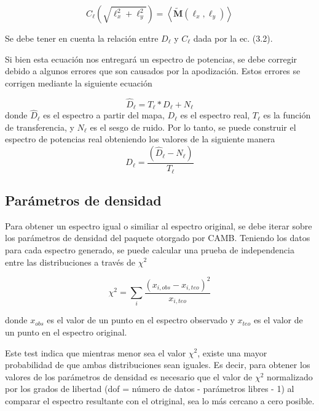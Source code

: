 \documentclass[twocolumn,letterpaper,spanish]{revtex4}
\numberwithin{equation}{section}
\begin{document}
\begin{equation}
C_{\ell}\left(\sqrt{\ell_{x}^{2}+\ell_{y}^{2}}\right)=\left\langle\tilde{\mathbf{M}}\left(\ell_{x}, \ell_{y}\right)\right\rangle
\end{equation}

Se debe tener en cuenta la relaci\'on entre $D_{\ell}$ y $C_{\ell}$ dada por la ec. (3.2).

Si bien esta ecuaci\'on nos entregar\'a un espectro de potencias, se debe corregir debido a algunos errores que son causados por la apodizaci\'on. Estos errores se corrigen mediante la siguiente ecuaci\'on

\begin{equation}
\hat{D}_{\ell}=T_{\ell} * D_{\ell}+N_{\ell}
\end{equation}
donde $\hat{D}_{\ell}$ es el espectro a partir del mapa, $D_{\ell}$ es el espectro real, $T_{\ell}$ es la funci\'on de transferencia, y $N_{\ell}$ es el sesgo de ruido.
Por lo tanto, se puede construir el espectro de potencias real obteniendo los valores de la siguiente manera
\begin{equation}
D_{\ell}=\frac{\left(\hat{D}_{\ell}-N_{\ell}\right)}{T_{\ell}}
\end{equation}


\subsection{Par\'ametros de densidad}\label{parametros}

Para obtener un espectro igual o similiar al espectro original, se debe iterar sobre los par\'ametros de densidad del paquete otorgado por CAMB. Teniendo los datos para cada espectro generado, se puede calcular una prueba de independencia entre las distribuciones a trav\'es de $\chi^2$

\begin{equation}
\chi^2 = \displaystyle\sum_{i} \frac{(x_{i,obs} - x_{i,teo})^2}{x_{i,teo}}
\end{equation}

donde $x_{obs}$ es el valor de un punto en el espectro observado y $x_{teo}$ es el valor de un punto en el espectro original.

Este test indica que mientras menor sea el valor $\chi^2$, existe una mayor probabilidad de que ambas distribuciones sean iguales. Es decir, para obtener los valores de los par\'ametros de densidad es necesario que el valor de $\chi^2$ normalizado por los grados de libertad (dof = n\'umero de datos - par\'ametros libres - 1) al comparar el espectro resultante con el otriginal, sea lo m\'as cercano a cero posible.
\end{document}
